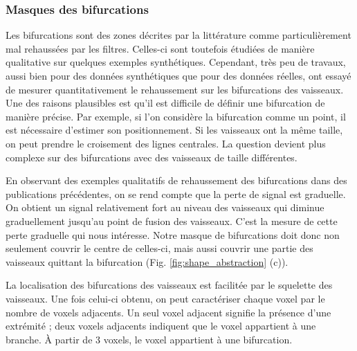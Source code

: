 


\subsubsection{Masques des bifurcations}

Les bifurcations sont des zones décrites par la littérature comme particulièrement mal rehaussées par les filtres. Celles-ci sont toutefois étudiées de manière qualitative sur quelques exemples synthétiques. Cependant, très peu de travaux, aussi bien pour des données synthétiques que pour des données réelles, ont essayé de mesurer quantitativement le rehaussement sur les bifurcations des vaisseaux. Une des raisons plausibles est qu'il est difficile de définir une bifurcation de manière précise. Par exemple, si l'on considère la bifurcation comme un point, il est nécessaire d'estimer son positionnement. Si les vaisseaux ont la même taille, on peut prendre le croisement des lignes centrales. La question devient plus complexe sur des bifurcations avec des vaisseaux de taille différentes.

En observant des exemples qualitatifs de rehaussement des bifurcations dans des publications précédentes, on se rend compte que la perte de signal est graduelle. On obtient un signal relativement fort au niveau des vaisseaux qui diminue graduellement jusqu'au point de fusion des vaisseaux. C'est la mesure de cette perte graduelle qui nous intéresse. Notre masque de bifurcations doit donc non seulement couvrir le centre de celles-ci, mais aussi couvrir une partie des vaisseaux quittant la bifurcation (Fig. \ref{fig:shape_abstraction} (c)).

La localisation des bifurcations des vaisseaux est facilitée par le squelette des vaisseaux. Une fois celui-ci obtenu, on peut caractériser chaque voxel par le nombre de voxels adjacents. Un seul voxel adjacent signifie la présence d'une extrémité ; deux voxels adjacents indiquent que le voxel appartient à une branche. À partir de 3 voxels, le voxel appartient à une bifurcation.

